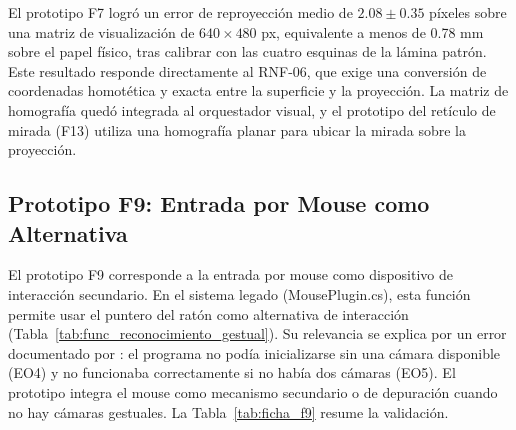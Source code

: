 El prototipo F7 logró un error de reproyección medio de $2.08 \pm 0.35$ píxeles sobre una matriz de visualización de $640 \times 480$ px, equivalente a menos de 0.78 mm sobre el papel físico, tras calibrar con las cuatro esquinas de la lámina patrón. Este resultado responde directamente al RNF-06, que exige una conversión de coordenadas homotética y exacta entre la superficie y la proyección. La matriz de homografía quedó integrada al orquestador visual, y el prototipo del retículo de mirada (F13) utiliza una homografía planar para ubicar la mirada sobre la proyección.
 
\subsection{Prototipo F9: Entrada por Mouse como Alternativa}
 
El prototipo F9 corresponde a la entrada por mouse como dispositivo de interacción secundario. En el sistema legado (MousePlugin.cs), esta función permite usar el puntero del ratón como alternativa de interacción (Tabla~\ref{tab:func_reconocimiento_gestual}). Su relevancia se explica por un error documentado por \cite{ibaceta2023evaluacion}: el programa no podía inicializarse sin una cámara disponible (EO4) y no funcionaba correctamente si no había dos cámaras (EO5). El prototipo integra el mouse como mecanismo secundario o de depuración cuando no hay cámaras gestuales. La Tabla~\ref{tab:ficha_f9} resume la validación.
 
